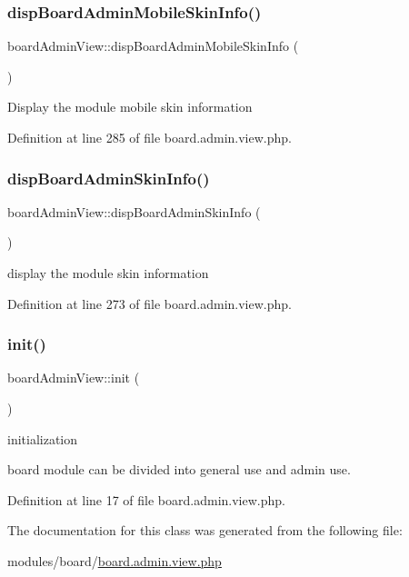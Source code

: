 \subsubsection{\texorpdfstring{disp\+Board\+Admin\+Mobile\+Skin\+Info()}{dispBoardAdminMobileSkinInfo()}}
{\footnotesize\ttfamily board\+Admin\+View\+::disp\+Board\+Admin\+Mobile\+Skin\+Info (\begin{DoxyParamCaption}{ }\end{DoxyParamCaption})}

Display the module mobile skin information 

Definition at line 285 of file board.\+admin.\+view.\+php.

\mbox{\label{classboardAdminView_a5cdd047b72e824441b70c4862c774b49}} 
\subsubsection{\texorpdfstring{disp\+Board\+Admin\+Skin\+Info()}{dispBoardAdminSkinInfo()}}
{\footnotesize\ttfamily board\+Admin\+View\+::disp\+Board\+Admin\+Skin\+Info (\begin{DoxyParamCaption}{ }\end{DoxyParamCaption})}



display the module skin information 



Definition at line 273 of file board.\+admin.\+view.\+php.

\mbox{\label{classboardAdminView_ac0c66d07632b7766e07543149e0b8cc5}} 
\subsubsection{\texorpdfstring{init()}{init()}}
{\footnotesize\ttfamily board\+Admin\+View\+::init (\begin{DoxyParamCaption}{ }\end{DoxyParamCaption})}



initialization 

board module can be divided into general use and admin use.~\newline


Definition at line 17 of file board.\+admin.\+view.\+php.



The documentation for this class was generated from the following file\+:\begin{DoxyCompactItemize}
\item 
modules/board/\hyperlink{board_8admin_8view_8php}{board.\+admin.\+view.\+php}\end{DoxyCompactItemize}

